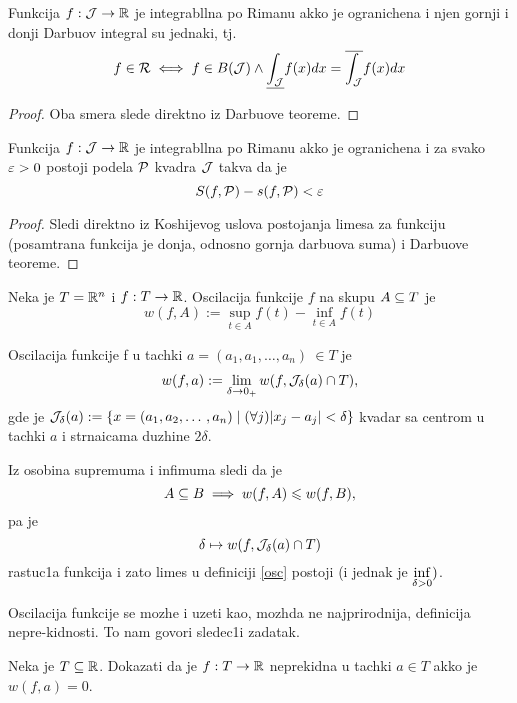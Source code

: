 \documentclass[../main.tex]{subfiles}
\begin{document}
	\begin{posl}
		Funkcija $f: \mathcal{J} \to \mathbb{R}$ je integrabllna po Rimanu akko je ogranichena i njen gornji i donji Darbuov integral su jednaki, tj.
		\[f \in \mathcal R \iff f \in B(\mathcal{J}) \land \underline{\int_{\mathcal{J}}} f(x)dx = \overline{\int_{\mathcal{J}}} f(x)dx \]
	\end{posl}

	\begin{proof}
		Oba smera slede direktno iz Darbuove teoreme.
	\end{proof}
	
	\begin{posl}
		\label{koshi_karakterizaijca_odr_integrala}
		Funkcija $f: \mathcal{J} \to \mathbb{R}$ je integrabllna po Rimanu akko je ogranichena i za svako $\varepsilon > 0$ postoji podela $\mathcal P$ kvadra $\mathcal{J}$ takva da je 
		\[S(f, \mathcal P) - s(f, \mathcal P) < \varepsilon\]
	\end{posl}
	
	\begin{proof}
		Sledi direktno iz Koshijevog uslova postojanja limesa za funkciju (posamtrana funkcija je donja, odnosno gornja darbuova suma) i Darbuove teoreme.
	\end{proof}

	\begin{de}
		\label{osc}
		Neka je $T = \mathbb{R} ^ n$ i $f : T \to \mathbb{R}$. Oscilacija funkcije $f$ na skupu $A \subseteq T$ je 
		\[w(f, A) := \sup_{t \in A} f(t) - \inf_{t \in A} f(t)\]	
	\end{de}

	\begin{de}
		Oscilacija funkcije f u tachki $a = (a_1, a_1, \dotso, a_n)\ \in T$ je 
		\begin{align*}
		 	w(f,a) := \lim_{\delta \to 0_+}w(f, \mathcal{J}_{\delta}(a) \cap T),
		\end{align*}
		gde je $\mathcal{J}_\delta(a) := \{x = (a_1, a_2, \dotso, a_n) \mid (\forall j) |x_j - a_j| < \delta\}$ kvadar sa centrom u tachki $a$ i strnaicama
		duzhine $2\delta$.
	\end{de}

	\nap Iz osobina supremuma i infimuma sledi da je \[A \subseteq B \implies w(f, A) \leqslant w(f,B), \]pa je \[\delta \mapsto w(f,\mathcal{J}_\delta(a) \cap T)\] rastuc1a funkcija
	i zato limes u definiciji \ref{osc} postoji (i jednak je $\displaystyle{\inf_{\delta > 0}})$.

	Oscilacija funkcije se mozhe i uzeti kao, mozhda ne najprirodnija, definicija nepre-kidnosti. To nam govori sledec1i zadatak.
	\begin{za}
		Neka je $T \subseteq \mathbb{R}$. Dokazati da je $f:T \to \mathbb{R}$ neprekidna u tachki $a\in T$ akko je $w(f,a) = 0$.
	\end{za}
\end{document}
